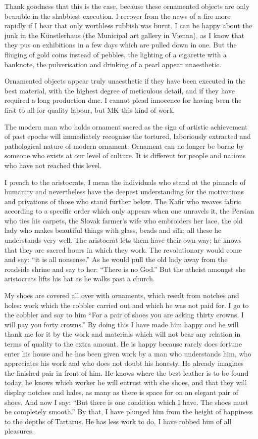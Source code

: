 \documentclass[a4paper]{article}
\begin{document}
Thank goodness that this is the case, because these ornamented objects are only bearable in the shabbiest execution. I recover from the news of a fire more rapidly if I hear that only worthless rubbish was burnt. I can be happy about the junk in the Künstlerhaus (the Municipal art gallery in Vienna), as I know that they pus on exhibitions in a few days which are pulled down in one. But the flinging of gold coins instead of pebbles, the lighting of a cigarette with a banknote, the pulverisation and drinking of a pearl appear unaesthetic.

Ornamented objects appear truly unaesthetic if they have been executed in the best material, with the highest degree of meticulous detail, and if they have required a long production dmc. I cannot plead innocence for having been the first to all for quality labour, but MK this kind of work.

The modern man who holds ornament sacred as the sign of artistic achievement of past epochs will immediately recognise the tortured, laboriously extracted and pathological nature of modern ornament. Ornament can no longer be borne by someone who exists at our level of culture. It is different for people and nations who have not reached this level.

I preach to the aristocrats, I mean the individuals who stand at the pinnacle of humanity and nevertheless have the deepest understanding for the motivations and privations of those who stand further below. The Kafir who weaves fabric according to a specific order which only appears when one unravels it, the Persian who ties his carpets, the Slovak farmer’s wife who embroiders her lace, the old lady who makes beautiful things with glass, beads and silk; all these he understands very well. The aristocrat lets them have their own way; he knows that they arc sacred hours in which they work. The revolutionary would come and say: “it is all nonsense.” As he would pull the old lady away from the roadside shrine and say to her: “There is no God.” But the atheist amongst she aristocrats lifts his hat as he walks past a church.

My shoes are covered all over with ornaments, which result from notches and holes: work which the cobbler carried out and which he was not paid for. I go to the cobbler and say to him “For a pair of shoes you are asking thirty crowns. I will pay you forty crowns.” By doing this I have made him happy and he will thank me for it by the work and materials which will not bear any relation in terms of quality to the extra amount. He is happy because rarely does fortune enter his house and he has been given work by a man who understands him, who appreciates his work and who does not doubt his honesty. He already imagines the finished pair in front of him. He knows where the best leather is to be found today, he knows which worker he will entrust with she shoes, and that they will display notches and hales, as many as there is space for on an elegant pair of shoes. And now I say: “But there is one condition which I have. The shoes must be completely smooth.” By that, I have plunged him from the height of happiness to the depths of Tartarus. He has less work to do, I have robbed him of all pleasures.
\end{document}
